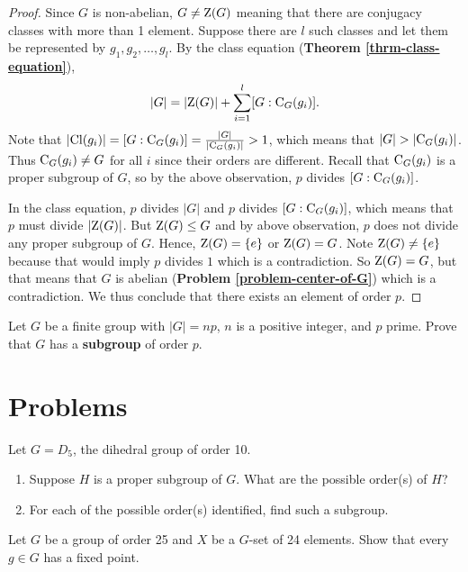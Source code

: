 \begin{proof}
    Since $G$ is non-abelian, $G \neq \mathrm{Z}(G)$ meaning that there are conjugacy classes with more than 1 element. Suppose there are $l$ such classes and let them be represented by $g_1, g_2, \dots, g_l$. By the class equation (\textbf{Theorem \ref{thrm-class-equation}}),
    \[
        |G| = |\mathrm{Z}(G)| + \sum_{i=1}^l [G:\mathrm{C}_{G}(g_i)].
    \]
    Note that $|\mathrm{Cl}(g_i)| = [G:\mathrm{C}_{G}(g_i)] = \frac{|G|}{|\mathrm{C}_{G}(g_i)|} > 1$, which means that $|G| > |\mathrm{C}_{G}(g_i)|$. Thus $\mathrm{C}_{G}(g_i) \neq G$ for all $i$ since their orders are different. Recall that $\mathrm{C}_{G}(g_i)$ is a proper subgroup of $G$, so by the above observation, $p$ divides $[G:\mathrm{C}_{G}(g_i)]$.

    In the class equation, $p$ divides $|G|$ and $p$ divides $[G:\mathrm{C}_{G}(g_i)]$, which means that $p$ must divide $|\mathrm{Z}(G)|$. But $\mathrm{Z}(G) \leq G$ and by above observation, $p$ does not divide any proper subgroup of $G$. Hence, $\mathrm{Z}(G) = \{e\}$ or $\mathrm{Z}(G) = G$. Note $\mathrm{Z}(G) \neq \{e\}$ because that would imply $p$ divides $1$ which is a contradiction. So $\mathrm{Z}(G) = G$, but that means that $G$ is abelian (\textbf{Problem \ref{problem-center-of-G}}) which is a contradiction. We thus conclude that there exists an element of order $p$.
\end{proof}

\begin{exercise}\label{exercise-group-of-order-multiple-of-prime-has-subgroup-of-prime-order}
    Let $G$ be a finite group with $|G| = np$, $n$ is a positive integer, and $p$ prime. Prove that $G$ has a \textbf{subgroup} of order $p$.
\end{exercise}

\newpage

\section{Problems}
\begin{problem}
    Let $G = D_5$, the dihedral group of order 10.
    \begin{enumerate}[label=(\alph*)]
        \item Suppose $H$ is a proper subgroup of $G$. What are the possible order(s) of $H$?
        \item For each of the possible order(s) identified, find such a subgroup.
    \end{enumerate}
\end{problem}

\begin{problem}
    Let $G$ be a group of order 25 and $X$ be a $G$-set of 24 elements. Show that every $g \in G$ has a fixed point.
\end{problem}

